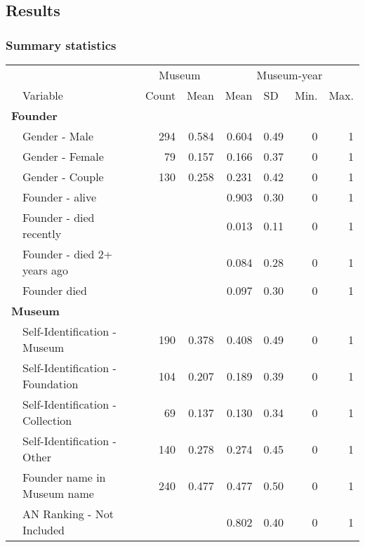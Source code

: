 \documentclass[12pt]{article}
\begin{document}
\subsection*{Results}


\subsubsection*{Summary statistics}


\begin{table}[ht]
\centering
\begin{tabular}{llrrrrrr}
  \hline
 & & \multicolumn{2}{c}{Museum} & \multicolumn{4}{c}{Museum-year} \\ 
\cmidrule(r){3-4}\cmidrule(r){5-8} \multicolumn{1}{l}{} & \multicolumn{1}{l}{Variable} & \multicolumn{1}{l}{Count} & \multicolumn{1}{l}{Mean} & \multicolumn{1}{l}{Mean} & \multicolumn{1}{l}{SD} & \multicolumn{1}{l}{Min.} & \multicolumn{1}{l}{Max.}\\ 
 \hline
  \multicolumn{8}{l}{\textbf{Founder}} \\ 
 & Gender - Male & 294 & 0.584 &    0.604 &  0.49 & 0 & 1 \\ 
   & Gender - Female & 79 & 0.157 &    0.166 &  0.37 & 0 & 1 \\ 
   & Gender - Couple & 130 & 0.258 &    0.231 &  0.42 & 0 & 1 \\ 
   & Founder - alive &  &  &    0.903 &  0.30 & 0 & 1 \\ 
   & Founder - died recently &  &  &    0.013 &  0.11 & 0 & 1 \\ 
   & Founder - died 2+ years ago &  &  &    0.084 &  0.28 & 0 & 1 \\ 
   & Founder died &  &  &    0.097 &  0.30 & 0 & 1 \\ 
   \multicolumn{8}{l}{\textbf{Museum}} \\ 
 & Self-Identification - Museum & 190 & 0.378 &    0.408 &  0.49 & 0 & 1 \\ 
   & Self-Identification - Foundation & 104 & 0.207 &    0.189 &  0.39 & 0 & 1 \\ 
   & Self-Identification - Collection & 69 & 0.137 &    0.130 &  0.34 & 0 & 1 \\ 
   & Self-Identification - Other & 140 & 0.278 &    0.274 &  0.45 & 0 & 1 \\ 
   & Founder name in Museum name & 240 & 0.477 &    0.477 &  0.50 & 0 & 1 \\ 
   & AN Ranking - Not Included &  &  &    0.802 &  0.40 & 0 & 1 \\ 

\end{tabular}
\end{table}
\end{document}
